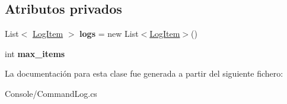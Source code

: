 \subsection*{Atributos privados}
\begin{DoxyCompactItemize}
\item 
\mbox{\label{class_command_terminal_1_1_command_log_a4c03b559f893405d8177b7c1ef201f6f}} 
List$<$ \mbox{\hyperlink{struct_command_terminal_1_1_log_item}{Log\+Item}} $>$ {\bfseries logs} = new List$<$\mbox{\hyperlink{struct_command_terminal_1_1_log_item}{Log\+Item}}$>$()
\item 
\mbox{\label{class_command_terminal_1_1_command_log_a85154c04a328727d47044c1466b2c737}} 
int {\bfseries max\+\_\+items}
\end{DoxyCompactItemize}


La documentación para esta clase fue generada a partir del siguiente fichero\+:\begin{DoxyCompactItemize}
\item 
Console/Command\+Log.\+cs\end{DoxyCompactItemize}
